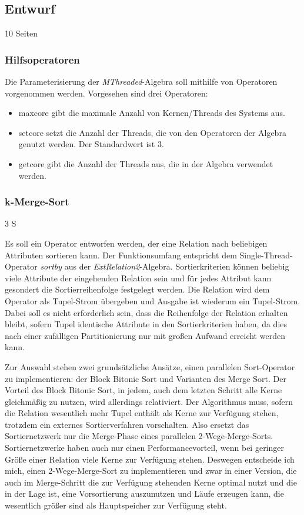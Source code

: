 \documentclass[a4paper,12pt,twoside]{article}
\newcommand{\Fb}[1]{\textit{#1}} %
\begin{document}
\subsection{Entwurf} 10 Seiten
\label{Entwicklung} 

\subsubsection{Hilfsoperatoren}

Die Parameterisierung der \Fb{MThreaded}-Algebra soll mithilfe von Operatoren vorgenommen werden. Vorgesehen sind drei Operatoren:

\begin{itemize}
	\item maxcore gibt die maximale Anzahl von Kernen/Threads des Systems aus.
	\item setcore setzt die Anzahl der Threads, die von den Operatoren der Algebra genutzt werden. Der Standardwert ist 3.
	\item getcore gibt die Anzahl der Threads aus, die in der Algebra verwendet werden.
\end{itemize}

\subsubsection{k-Merge-Sort} 3 S
\label{entw:sort}

Es soll ein Operator entworfen werden, der eine Relation nach beliebigen Attributen sortieren kann. Der Funktionsumfang entspricht dem Single-Thread-Operator \Fb{sortby} aus der \Fb{ExtRelation2}-Algebra. Sortierkriterien können beliebig viele Attribute der eingehenden Relation sein und für jedes Attribut kann gesondert die Sortierreihenfolge festgelegt werden. Die Relation wird dem Operator als Tupel-Strom übergeben und Ausgabe ist wiederum ein Tupel-Strom. Dabei soll es nicht erforderlich sein, dass die Reihenfolge der Relation erhalten bleibt, sofern Tupel identische Attribute in den Sortierkriterien haben, da dies nach einer zufälligen Partitionierung nur mit großen Aufwand erreicht werden kann.

Zur Auswahl stehen zwei grundsätzliche Ansätze, einen parallelen Sort-Operator zu implementieren: der Block Bitonic Sort und Varianten des Merge Sort. Der Vorteil des Block Bitonic Sort, in jedem, auch dem letzten Schritt alle Kerne gleichmäßig zu nutzen, wird allerdings relativiert. Der Algorithmus muss, sofern die Relation wesentlich mehr Tupel enthält als Kerne zur Verfügung stehen, trotzdem ein externes Sortierverfahren vorschalten. Also ersetzt das Sortiernetzwerk nur die Merge-Phase eines parallelen 2-Wege-Merge-Sorts. Sortiernetzwerke haben auch nur einen Performancevorteil, wenn bei geringer Größe einer Relation viele Kerne zur Verfügung stehen. Deswegen entscheide ich mich, einen 2-Wege-Merge-Sort zu implementieren und zwar in einer Version, die auch im Merge-Schritt die zur Verfügung stehenden Kerne optimal nutzt und die in der Lage ist, eine Vorsortierung auszunutzen und Läufe erzeugen kann, die wesentlich größer sind als Hauptspeicher zur Verfügung steht.
\end{document}
